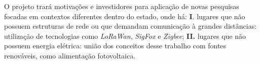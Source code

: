 O projeto trará motivações e investidores para aplicação de novas pesquisas focadas em contextos diferentes dentro do estado, onde há: \textbf{I}. lugares que não possuem estruturas de rede ou que demandam comunicação à grandes distâncias: utilização de tecnologias como \textit{LoRaWan}, \textit{SigFox} e \textit{Zigbee}; \textbf{II.} lugares que não possuem energia elétrica: união dos conceitos desse trabalho com fontes renováveis, como alimentação fotovoltaica.

